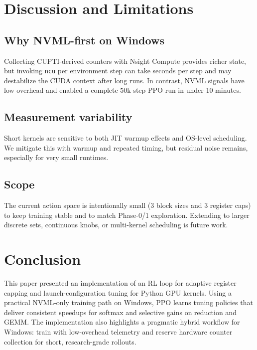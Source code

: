 \documentclass[journal,letterpaper]{IEEEtran}
\begin{document}
\section{Discussion and Limitations}
\label{sec:limits}

\subsection{Why NVML-first on Windows}
Collecting CUPTI-derived counters with Nsight Compute provides richer state, but invoking \texttt{ncu} per environment step can take seconds per step and may destabilize the CUDA context after long runs.
In contrast, NVML signals have low overhead and enabled a complete 50k-step PPO run in under 10 minutes.

\subsection{Measurement variability}
Short kernels are sensitive to both JIT warmup effects and OS-level scheduling.
We mitigate this with warmup and repeated timing, but residual noise remains, especially for very small runtimes.

\subsection{Scope}
The current action space is intentionally small (3 block sizes and 3 register caps) to keep training stable and to match Phase-0/1 exploration.
Extending to larger discrete sets, continuous knobs, or multi-kernel scheduling is future work.

\section{Conclusion}
\label{sec:conclusion}

This paper presented an implementation of an RL loop for adaptive register capping and launch-configuration tuning for Python GPU kernels.
Using a practical NVML-only training path on Windows, PPO learns tuning policies that deliver consistent speedups for softmax and selective gains on reduction and GEMM.
The implementation also highlights a pragmatic hybrid workflow for Windows: train with low-overhead telemetry and reserve hardware counter collection for short, research-grade rollouts.
\end{document}
